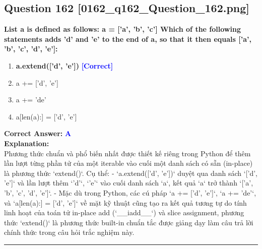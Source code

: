 \documentclass[11pt,a4paper]{article}
\begin{document}
\begin{minipage}{\textwidth}
\subsection*{Question 162 \quad \footnotesize{[0162_q162_Question_162.png]}}
\noindent \textbf{List a is defined as follows: a = ['a', 'b', 'c'] Which of the following statements adds 'd' and 'e' to the end of a, so that it then equals ['a', 'b', 'c', 'd', 'e']:}

\begin{enumerate}[label=\Alph*.]
    \item \textbf{a.extend(['d', 'e'])} \hfill \textcolor{blue}{\textbf{[Correct]}}
    \item a += ['d', 'e']
    \item a += 'de'
    \item a[len(a):] = ['d', 'e']
\end{enumerate}

\noindent \textbf{Correct Answer:} \textcolor{blue}{\textbf{A}} \\[4pt]
\noindent \textbf{Explanation:}\\
Phương thức chuẩn và phổ biến nhất được thiết kế riêng trong Python để thêm lần lượt từng phần tử của một iterable vào cuối một danh sách có sẵn (in-place) là phương thức `extend()`. Cụ thể:\newline
- `a.extend(['d', 'e'])` duyệt qua danh sách `['d', 'e']` và lần lượt thêm `'d'`, `'e'` vào cuối danh sách `a`, kết quả `a` trở thành `['a', 'b', 'c', 'd', 'e']`.\newline
- Mặc dù trong Python, các cú pháp `a += ['d', 'e']`, `a += 'de'`, và `a[len(a):] = ['d', 'e']` về mặt kỹ thuật cũng tạo ra kết quả tương tự do tính linh hoạt của toán tử in-place add (`__iadd__`) và slice assignment, phương thức `extend()` là phương thức built-in chuẩn tắc được giảng dạy làm câu trả lời chính thức trong câu hỏi trắc nghiệm này.
\end{minipage}
\vspace{0.8cm}
\hrule
\vspace{0.5cm}
\end{document}
